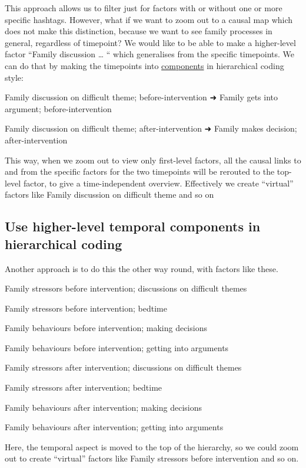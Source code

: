 \documentclass[
]{book}
\begin{document}
This approach allows us to filter just for factors with or without one or more specific hashtags. However, what if we want to zoom out to a causal map which does not make this distinction, because we want to see family processes in general, regardless of timepoint? We would like to be able to make a higher-level factor ``Family discussion \ldots{} `` which generalises from the specific timepoints. We can do that by making the timepoints into \href{https://causalmapdocumentation.blot.im/search?q=component}{components} in hierarchical coding style:

Family discussion on difficult theme; before-intervention ➜ Family gets into argument; before-intervention

Family discussion on difficult theme; after-intervention ➜ Family makes decision; after-intervention

This way, when we zoom out to view only first-level factors, all the causal links to and from the specific factors for the two timepoints will be rerouted to the top-level factor, to give a time-independent overview. Effectively we create ``virtual'' factors like Family discussion on difficult theme and so on

\hypertarget{use-higher-level-temporal-components-in-hierarchical-coding}{%
\subsection{Use higher-level temporal components in hierarchical coding}\label{use-higher-level-temporal-components-in-hierarchical-coding}}

Another approach is to do this the other way round, with factors like these.

Family stressors before intervention; discussions on difficult themes

Family stressors before intervention; bedtime

Family behaviours before intervention; making decisions

Family behaviours before intervention; getting into arguments

Family stressors after intervention; discussions on difficult themes

Family stressors after intervention; bedtime

Family behaviours after intervention; making decisions

Family behaviours after intervention; getting into arguments

Here, the temporal aspect is moved to the top of the hierarchy, so we could zoom out to create ``virtual'' factors like Family stressors before intervention and so on.
\end{document}
